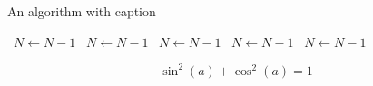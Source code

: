 \documentclass[a4paper]{article}
\begin{document}
\begin{algorithm}
\caption{An algorithm with caption}
\begin{algorithmic}
\    \State $N \gets N - 1$
\    \State $N \gets N - 1$
\    \State $N \gets N - 1$
\    \State $N \gets N - 1$
\    \State $N \gets N - 1$
\EndWhile
\end{algorithmic}
\end{algorithm}

\[ \sin^2(a)+\cos^2(a) = 1 \]
\end{document}
